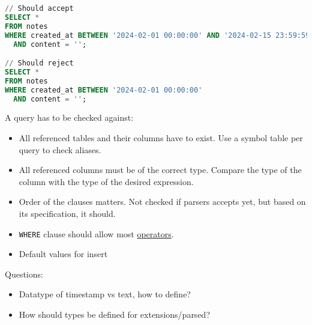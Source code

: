 \documentclass[11pt, letterpaper]{article}
\begin{document}
\begin{lstlisting}[language=SQL]
// Should accept
SELECT *
FROM notes
WHERE created_at BETWEEN '2024-02-01 00:00:00' AND '2024-02-15 23:59:59'
  AND content = '';

// Should reject
SELECT *
FROM notes
WHERE created_at BETWEEN '2024-02-01 00:00:00'
  AND content = '';
\end{lstlisting}

A query has to be checked against:
\begin{itemize}
  \item All referenced tables and their columns have to exist. Use a symbol table per query to check aliases.
  \item All referenced columns must be of the correct type. Compare the type of the column with the type of the desired expression.
  \item Order of the clauses matters. Not checked if parsers accepts yet, but based on its specification, it should.
  \item \lstinline{WHERE} clause should allow most \href{https://www.postgresql.org/docs/9.0/functions.html}{operators}.
  \item Default values for insert
\end{itemize}

Questions:

\begin{itemize}
  \item Datatype of timestamp vs text, how to define?
  \item How should types be defined for extensions/parsed?
\end{itemize}


{\footnotesize}
\end{document}
